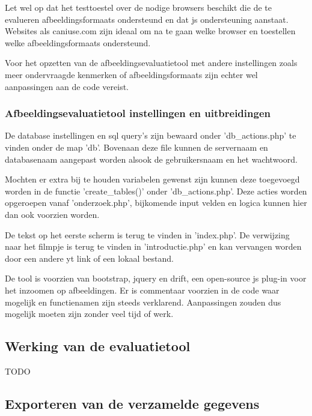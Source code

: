 Let wel op dat het testtoestel over de nodige browsers beschikt die de te evalueren \glspl{afbeeldingsformaat} ondersteund en dat \gls{js} ondersteuning aanstaat. Websites als caniuse.com zijn ideaal om na te gaan welke browser en toestellen welke \glspl{afbeeldingsformaat} ondersteund.

Voor het opzetten van de \gls{afbeeldingsevaluatietool} met andere instellingen zoals meer ondervraagde kenmerken of \glspl{afbeeldingsformaat} zijn echter wel aanpassingen aan de code vereist. 

\subsubsection{Afbeeldingsevaluatietool instellingen en uitbreidingen}
\label{sec:onderzoek-evaluatietool-setup-database}

De database instellingen en \gls{sql} query's zijn bewaard onder 'db\_actions.php' te vinden onder de map 'db'. Bovenaan deze file kunnen de servernaam en databasenaam aangepast worden alsook de gebruikersnaam en het wachtwoord.

Mochten er extra bij te houden variabelen gewenst zijn kunnen deze toegevoegd worden in de functie 'create\_tables()' onder 'db\_actions.php'. Deze acties worden opgeroepen vanaf 'onderzoek.php', bijkomende input velden en logica kunnen hier dan ook voorzien worden.

De tekst op het eerste scherm is terug te vinden in 'index.php'. De verwijzing naar het filmpje is terug te vinden in 'introductie.php' en kan vervangen worden door een andere \gls{yt} link of een lokaal bestand.

De tool is voorzien van \gls{bootstrap}, \gls{jquery} en \gls{drift}, een \gls{open-source} \gls{js} \gls{plug-in} voor het inzoomen op afbeeldingen. Er is commentaar voorzien in de code waar mogelijk en functienamen zijn steeds verklarend. Aanpassingen zouden dus mogelijk moeten zijn zonder veel tijd of werk.

\subsection{Werking van de evaluatietool}
\label{sec:onderzoek-evaluatietool-werking}

TODO

\subsection{Exporteren van de verzamelde gegevens}
\label{sec:onderzoek-evaluatietool-export}

